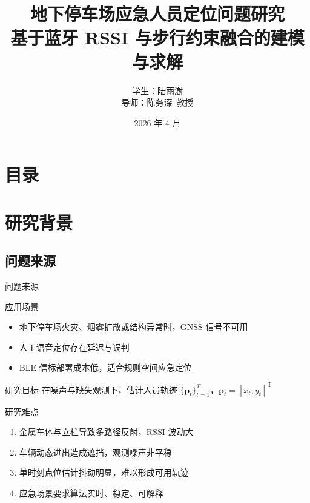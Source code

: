 \documentclass[aspectratio=169]{beamer}
\title[地下停车场应急人员定位]{地下停车场应急人员定位问题研究\\[2mm]基于蓝牙 RSSI 与步行约束融合的建模与求解}
\author[陆雨澍]{学生：陆雨澍\\[5mm] 导师：陈务深~教授}
\institute[南京工业大学]{\small 南京工业大学\\数理科学学院数学系}
\date{\small \vskip -10pt 2026 年 4 月}
\newcommand{\T}{\mathrm{T}}
\begin{document}
\begin{frame}
  \maketitle
\end{frame}

\section*{目录}
\frame{
  \frametitle{\secname}
  \tableofcontents[hideallsubsections]
}

\section{研究背景}

\subsection{问题来源}

\begin{frame}{问题来源}
  \begin{block}{应用场景}
    \begin{itemize}
      \setlength{\itemsep}{6pt}
      \item 地下停车场火灾、烟雾扩散或结构异常时，GNSS 信号不可用
      \item 人工语音定位存在延迟与误判
      \item BLE 信标部署成本低，适合规则空间应急定位
    \end{itemize}
  \end{block}
  \begin{block}{研究目标}
    在噪声与缺失观测下，估计人员轨迹 $\{\bm p_t\}_{t=1}^{T}$，$\bm p_t=[x_t,y_t]^{\T}$
  \end{block}
\end{frame}

\begin{frame}{研究难点}
  \begin{enumerate}
    \setlength{\itemsep}{8pt}
    \item 金属车体与立柱导致多路径反射，RSSI 波动大
    \item 车辆动态进出造成遮挡，观测噪声非平稳
    \item 单时刻点位估计抖动明显，难以形成可用轨迹
    \item 应急场景要求算法实时、稳定、可解释
  \end{enumerate}
\end{frame}
\end{document}
